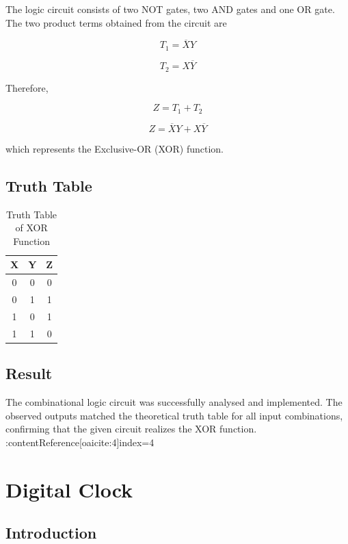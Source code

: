 \documentclass[12pt,a4paper]{report}
\begin{document}
The logic circuit consists of two NOT gates, two AND gates and one OR gate. The two product terms obtained from the circuit are

\[
T_1=\overline{X}Y
\]

\[
T_2=X\overline{Y}
\]

Therefore,

\[
Z=T_1+T_2
\]

\[
Z=\overline{X}Y+X\overline{Y}
\]

which represents the Exclusive-OR (XOR) function.


\section{Truth Table}

\begin{table}[H]
\centering
\caption{Truth Table of XOR Function}

\begin{tabular}{|c|c|c|}
\hline
X & Y & Z\\
\hline
0 & 0 & 0\\
0 & 1 & 1\\
1 & 0 & 1\\
1 & 1 & 0\\
\hline
\end{tabular}

\end{table}

\section{Result}

The combinational logic circuit was successfully analysed and implemented. The observed outputs matched the theoretical truth table for all input combinations, confirming that the given circuit realizes the XOR function. :contentReference[oaicite:4]{index=4}


\chapter{Digital Clock}

\section{Introduction}
\end{document}
